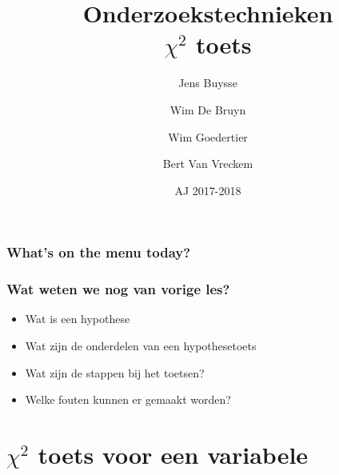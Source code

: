 \documentclass{beamer}
\title[Intro]{Onderzoekstechnieken\\$\chi^{2}$ toets}
\author{Jens Buysse \and Wim {De Bruyn} \and Wim Goedertier \and Bert {Van Vreckem}}
\date{AJ 2017-2018}
\begin{document}

\HoGentLogo

\titleframe





\begin{frame}
  \frametitle{What's on the menu today?}

  \tableofcontents
\end{frame}

\begin{frame}
  \frametitle{Wat weten we nog van vorige les?}

  \begin{itemize}
    \item Wat is een hypothese
    \item Wat zijn de onderdelen van een hypothesetoets
    \item Wat zijn de stappen bij het toetsen?
    \item Welke fouten kunnen er gemaakt worden?
  \end{itemize}
\end{frame}

\section{$\chi^{2}$ toets voor een variabele}
\sectionframelogo{}
\end{document}
